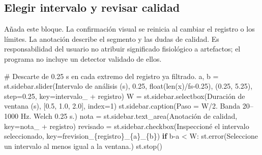 \documentclass[
  spanish,
  10.5pt,
  a4paper,
  DIV=11,
  numbers=noendperiod]{scrartcl}
\newenvironment{Shaded}{\begin{snugshade}}{\end{snugshade}}
\newcommand{\BuiltInTok}[1]{\textcolor[rgb]{0.00,0.23,0.31}{#1}}
\newcommand{\CommentTok}[1]{\textcolor[rgb]{0.37,0.37,0.37}{#1}}
\newcommand{\ControlFlowTok}[1]{\textcolor[rgb]{0.00,0.23,0.31}{\textbf{#1}}}
\newcommand{\DecValTok}[1]{\textcolor[rgb]{0.68,0.00,0.00}{#1}}
\newcommand{\FloatTok}[1]{\textcolor[rgb]{0.68,0.00,0.00}{#1}}
\newcommand{\NormalTok}[1]{\textcolor[rgb]{0.00,0.23,0.31}{#1}}
\newcommand{\OperatorTok}[1]{\textcolor[rgb]{0.37,0.37,0.37}{#1}}
\newcommand{\SpecialCharTok}[1]{\textcolor[rgb]{0.37,0.37,0.37}{#1}}
\newcommand{\SpecialStringTok}[1]{\textcolor[rgb]{0.13,0.47,0.30}{#1}}
\newcommand{\StringTok}[1]{\textcolor[rgb]{0.13,0.47,0.30}{#1}}
\begin{document}
\subsection{Elegir intervalo y revisar
calidad}\label{elegir-intervalo-y-revisar-calidad}

Añada este bloque. La confirmación visual se reinicia al cambiar el
registro o los límites. La anotación describe el segmento y las dudas de
calidad. Es responsabilidad del usuario no atribuir significado
fisiológico a artefactos; el programa no incluye un detector validado de
ellos.

\begin{Shaded}
\begin{Highlighting}[]
\CommentTok{\# Descarte de 0.25 s en cada extremo del registro ya filtrado.}
\NormalTok{a, b }\OperatorTok{=}\NormalTok{ st.sidebar.slider(}\StringTok{\textquotesingle{}Intervalo de análisis (s)\textquotesingle{}}\NormalTok{,}
    \FloatTok{0.25}\NormalTok{, }\BuiltInTok{float}\NormalTok{(}\BuiltInTok{len}\NormalTok{(x)}\OperatorTok{/}\NormalTok{fs}\OperatorTok{{-}}\FloatTok{0.25}\NormalTok{), (}\FloatTok{0.25}\NormalTok{, }\FloatTok{5.25}\NormalTok{), step}\OperatorTok{=}\FloatTok{0.25}\NormalTok{,}
\NormalTok{    key}\OperatorTok{=}\StringTok{\textquotesingle{}intervalo\_\textquotesingle{}} \OperatorTok{+}\NormalTok{ registro)}
\NormalTok{W }\OperatorTok{=}\NormalTok{ st.sidebar.selectbox(}\StringTok{\textquotesingle{}Duración de ventana (s)\textquotesingle{}}\NormalTok{, [}\FloatTok{0.5}\NormalTok{, }\FloatTok{1.0}\NormalTok{, }\FloatTok{2.0}\NormalTok{], index}\OperatorTok{=}\DecValTok{1}\NormalTok{)}
\NormalTok{st.sidebar.caption(}\StringTok{\textquotesingle{}Paso = W/2. Banda 20–1000 Hz. Welch 0.25 s.\textquotesingle{}}\NormalTok{)}
\NormalTok{nota }\OperatorTok{=}\NormalTok{ st.sidebar.text\_area(}\StringTok{\textquotesingle{}Anotación de calidad\textquotesingle{}}\NormalTok{,}
\NormalTok{                           key}\OperatorTok{=}\StringTok{\textquotesingle{}nota\_\textquotesingle{}} \OperatorTok{+}\NormalTok{ registro)}
\NormalTok{revisado }\OperatorTok{=}\NormalTok{ st.sidebar.checkbox(}\StringTok{\textquotesingle{}Inspeccioné el intervalo seleccionado\textquotesingle{}}\NormalTok{,}
\NormalTok{                              key}\OperatorTok{=}\SpecialStringTok{f\textquotesingle{}revision\_}\SpecialCharTok{\{}\NormalTok{registro}\SpecialCharTok{\}}\SpecialStringTok{\_}\SpecialCharTok{\{}\NormalTok{a}\SpecialCharTok{\}}\SpecialStringTok{\_}\SpecialCharTok{\{}\NormalTok{b}\SpecialCharTok{\}}\SpecialStringTok{\textquotesingle{}}\NormalTok{)}
\ControlFlowTok{if}\NormalTok{ b}\OperatorTok{{-}}\NormalTok{a }\OperatorTok{\textless{}}\NormalTok{ W:}
\NormalTok{    st.error(}\StringTok{\textquotesingle{}Seleccione un intervalo al menos igual a la ventana.\textquotesingle{}}\NormalTok{)}
\NormalTok{    st.stop()}


\end{Highlighting}
\end{Shaded}
\end{document}
